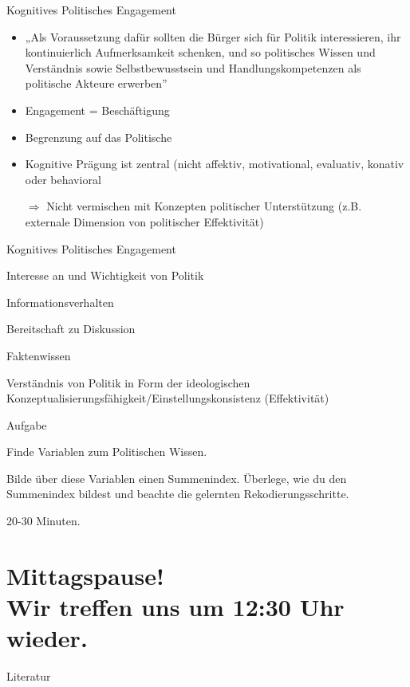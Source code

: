 \documentclass[11pt]{beamer}
\begin{document}
\begin{frame}{Kognitives Politisches Engagement \parencite{Westle2020}}
	\begin{itemize}
		\item	„Als Voraussetzung dafür sollten die Bürger sich für Politik interessieren, ihr kontinuierlich Aufmerksamkeit schenken, und so politisches Wissen und Verständnis sowie Selbstbewusstsein und Handlungskompetenzen als politische Akteure erwerben” \parencite[273]{Westle2020}
	\end{itemize}
	
	 \pause
	\begin{itemize}
		\item Engagement = Beschäftigung \parencite[278]{Westle2020}
		\item Begrenzung auf das Politische \parencite[278]{Westle2020}
		\item Kognitive Prägung ist zentral (nicht affektiv, motivational, evaluativ, konativ oder behavioral \parencite[278]{Westle2020} \pause
		\item[$\Rightarrow$] Nicht vermischen mit Konzepten politischer Unterstützung (z.B. externale Dimension von politischer Effektivität)
	\end{itemize}
\end{frame}

\begin{frame}{Kognitives Politisches Engagement \parencite{Westle2020}}
	\begin{nolist}
		\item Interesse an und Wichtigkeit von Politik
		\item Informationsverhalten
		\item Bereitschaft zu Diskussion
		\item Faktenwissen
		\item Verständnis von Politik in Form der ideologischen Konzeptualisierungsfähigkeit/Einstellungskonsistenz (Effektivität)
	\end{nolist}
\end{frame}

\renewcommand*{\bibfont}{\scriptsize}

\begin{frame}{Aufgabe}

	\begin{nolist}
		\item Finde Variablen zum Politischen Wissen. 
		\item Bilde über diese Variablen einen Summenindex. Überlege, wie du den Summenindex bildest und beachte die gelernten Rekodierungsschritte.
	\end{nolist}

 20-30 Minuten.
\end{frame}

\section{Mittagspause! \\ Wir treffen uns um 12:30 Uhr wieder.}

\begin{frame}[allowframebreaks]{Literatur}
	\nocite{*}
	\printbibliography[heading = none]
\end{frame}
\end{document}
